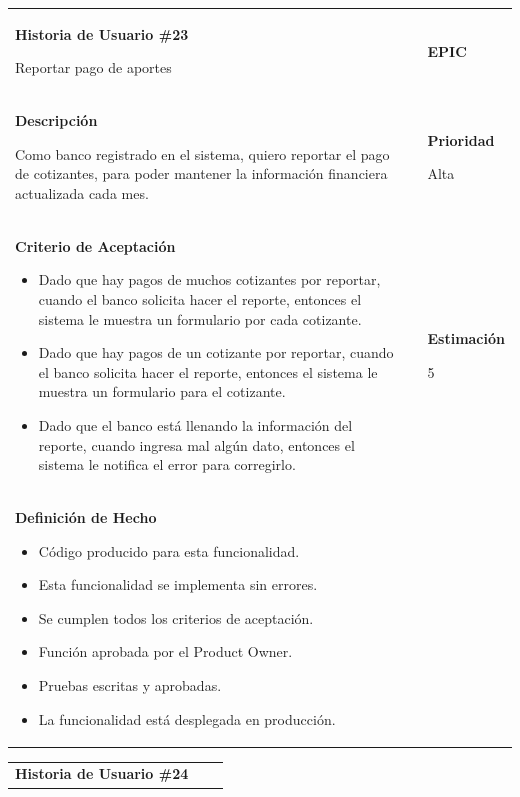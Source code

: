 \documentclass[12pt,a4paper]{article}
\begin{document}
\begin{center}
\begin{tabular}{|>{\columncolor[RGB]{215, 215, 215}} p{10cm} >{\columncolor[RGB]{215, 215, 215}} c >{\columncolor[RGB]{215, 215, 215}} p{2.5cm}|}
\hline 
\textbf{Historia de Usuario \#23}

Reportar pago de aportes & & \textbf{{\Large EPIC}} \\ 
\textbf{Descripción}

Como banco registrado en el sistema, quiero reportar el pago de
cotizantes, para poder mantener la información financiera actualizada
cada mes. &  & \textbf{Prioridad}

Alta\\

\textbf{Criterio de Aceptación}

\begin{itemize}
\item Dado que hay pagos de muchos cotizantes por reportar, cuando
el banco solicita hacer el reporte, entonces el sistema le muestra
un formulario por cada cotizante.
\item Dado que hay pagos de un cotizante por reportar, cuando el
banco solicita hacer el reporte, entonces el sistema le muestra un
formulario para el cotizante.
\item Dado que el banco está llenando la información del reporte,
cuando ingresa mal algún dato, entonces el sistema le notifica el
error para corregirlo.
\end{itemize} & & \textbf{Estimación}

5 \\ 

\textbf{Definición de Hecho}

\begin{itemize}
\item Código producido para esta funcionalidad.
\item Esta funcionalidad se implementa sin errores.
\item Se cumplen todos los criterios de aceptación.
\item Función aprobada por el Product Owner.
\item Pruebas escritas y aprobadas.
\item La funcionalidad está desplegada en producción.
\end{itemize} & & \\
\hline  
\end{tabular}
\vspace{5mm}

\begin{tabular}{| p{10cm} c p{2.5cm}|}
\hline 
\textbf{Historia de Usuario \#24}


\end{tabular}
\end{center}
\end{document}
